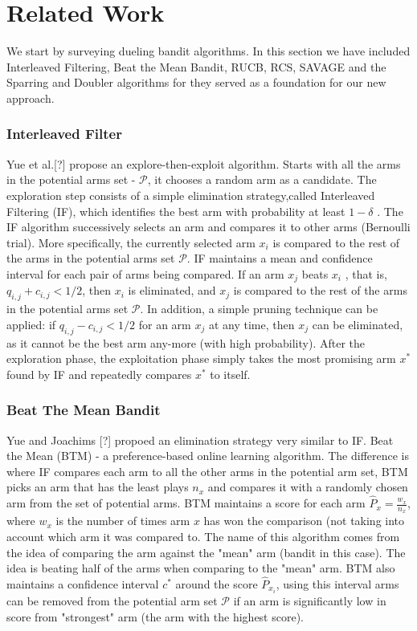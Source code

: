 \documentclass{llncs}
\begin{document}
\newpage

\section{Related Work}
	We start by surveying dueling bandit algorithms. In this section we have included Interleaved Filtering, Beat the Mean Bandit, RUCB, RCS, SAVAGE and the Sparring and Doubler algorithms for they served as a foundation for our new approach.
	
\subsubsection{Interleaved Filter}
	Yue et al.[?] propose an explore-then-exploit algorithm.
	Starts with all the arms in the potential arms set - $\mathcal{P}$, it chooses a random arm as a candidate. 
	The exploration step consists of a simple elimination strategy,called Interleaved Filtering (IF), which identifies the best arm with probability at least $1-\delta $ . 
	The IF algorithm successively selects an arm and compares it to other arms (Bernoulli trial). 
	More specifically, the currently selected arm $x_i$ is compared to the rest of the arms in the potential arms set $\mathcal{P}$.
	IF maintains a mean and confidence interval for each pair of arms being compared. 
	If an arm $x_j$ beats $x_i$ , that is, $q_{i,j}+c_{i,j}<1/2$, then $x_i$ is eliminated, and $x_j$ is compared to the rest of the arms in the potential arms set $\mathcal{P}$.
	In addition, a simple pruning technique can be applied: if $q_{i,j}-c_{i,j}<1/2$ for an arm $x_j$ at any time, then $x_j$ can be eliminated, as it cannot be the best arm any-more (with high probability). 
	After the exploration phase, the exploitation phase simply takes the most promising arm $x^*$ found by IF and repeatedly compares $x^*$ to itself.	
	
	

\newpage

\subsubsection{Beat The Mean Bandit}	
	Yue and Joachims [?] propoed an elimination strategy very similar to IF. Beat the Mean (BTM) - a preference-based online learning algorithm. 
	The difference is where IF compares each arm to all the other arms in the potential arm set, BTM picks an arm that has the least plays $n_x$ and compares it with a randomly chosen arm from the set of potential arms.
	BTM maintains a score for each arm $\hat{P}_{x} = \frac{w_x}{n_x}$, where $w_x$ is the number of times arm $x$ has won the comparison (not taking into account which arm it was compared to.
	The name of this algorithm comes from the idea of comparing the arm against the "mean" arm (bandit in this case).
	The idea is beating half of the arms when comparing to the "mean" arm. 
	BTM also maintains a confidence interval $c^*$ around the score	$\hat{P}_{x_i}$, using this interval arms can be removed from the potential arm set $\mathcal{P}$ if an arm is significantly low in score from "strongest" arm (the arm with the highest score).
	
\end{document}
